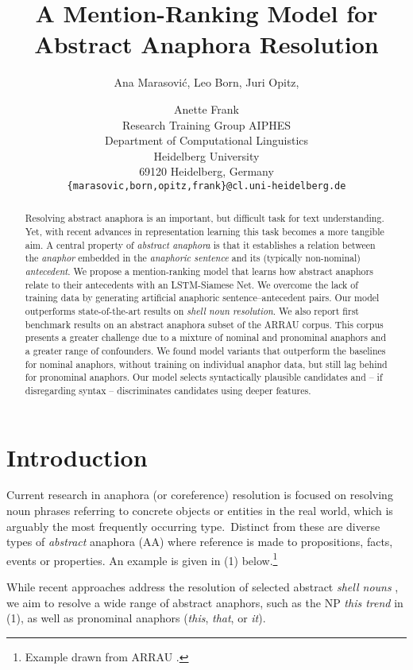 \documentclass[11pt,letterpaper]{article}
\title{A Mention-Ranking Model for Abstract Anaphora Resolution 
}
\author{Ana Marasovi\'c, Leo Born\Thanks{Leo Born, Juri Opitz and Anette Frank contributed equally to this work.}, Juri Opitz\footnotemark[1], \and Anette Frank\footnotemark[1]\\
	    Research Training Group AIPHES\\
	    Department of Computational Linguistics\\
	    Heidelberg University\\
	    69120 Heidelberg, Germany\\
	     {\tt \{marasovic,born,opitz,frank\}@cl.uni-heidelberg.de}
}
\date{}
\begin{document}
	\maketitle
	\begin{abstract}
		Resolving abstract anaphora is an important, but difficult task for text understanding. 
Yet, with recent advances in re\-pre\-sen\-ta\-tion learning this task
becomes a more tangible aim.
		A central property of {\em ab\-stra\-ct anaphora} is that it establishes a relation between the {\em anaphor} embedded in the {\em anaphoric sentence} and its (ty\-pi\-cal\-ly 
non-nominal) {\em antecedent}. 
		We pro\-po\-se a mention-ranking model that learns how abstract anaphors relate to their an\-te\-ce\-dents 
with an LSTM-Siamese Net.
We over\-come the lack of training data by ge\-ne\-ra\-ting 
artificial anaphoric sentence--antecedent pairs. Our model outperforms state-of-the-art results on {\em shell noun re\-so\-lu\-tion}. We  also report first benchmark results on an abstract anaphora subset of the ARRAU corpus.
		This corpus presents a greater challenge due to a mixture of nominal and pronominal anaphors and 
		a greater range of confounders. We found model variants that outperform the baselines for nominal anaphors, without training on individual anaphor data, but still lag behind for pronominal anaphors. 
		Our model selects syntactically plausible candidates and -- if disregarding syntax -- discriminates candidates using deeper features. 

		
	\end{abstract} 
	
	\section{Introduction}



Current research in anaphora (or coreference) resolution is focused on resolving noun phrases referring to concrete objects or entities in the real world, which is arguably the most frequently occurring type.\ 
Distinct from these are diverse types of {\em abstract} anaphora (AA) \cite{Asher:abstractobj} where reference is made to propositions,  facts, events or properties. An example is given in (1) below.\footnote{Example drawn from ARRAU \citep{uryupina2016arrau}.}
 




While recent approaches address
the 
resolution of selected abstract {\em shell nouns} \citep{kolhatkar-hirst:2014:EMNLP2014}, 
we aim
to resolve a wide range of abstract anaphors, such as the NP
\textit{this trend} in (1), 
as well as pronominal anaphors (\textit{this}, \textit{that}, or \textit{it}).
\end{document}
